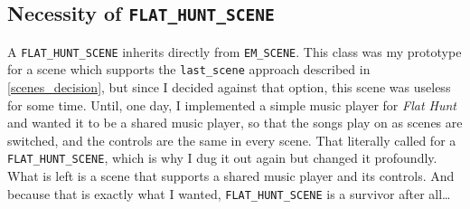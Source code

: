 \subsection{Necessity of \texttt{FLAT\_HUNT\_SCENE}}
A \texttt{FLAT\_HUNT\_SCENE} inherits directly from \texttt{EM\_SCENE}. This class was my prototype for a scene which supports the \texttt{last\_scene} approach described in \autoref{scenes_decision}, but since I decided against that option, this scene was useless for some time. Until, one day, I implemented a simple music player for \emph{Flat Hunt} and wanted it to be a shared music player, so that the songs play on as scenes are switched, and the controls are the same in every scene. That literally called for a \texttt{FLAT\_HUNT\_SCENE}, which is why I dug it out again but changed it profoundly. What is left is a scene that supports a shared music player and its controls. And because that is exactly what I wanted, \texttt{FLAT\_HUNT\_SCENE} is a survivor after all\ldots

